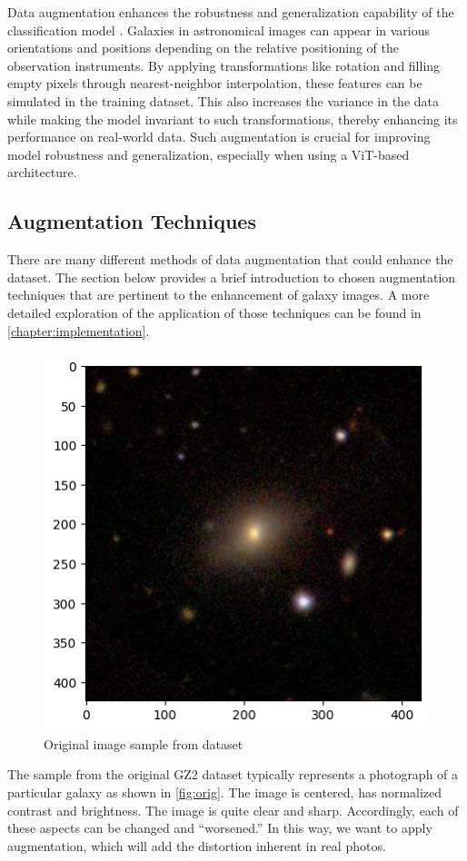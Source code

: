 Data augmentation enhances the robustness and generalization capability of the classification model \cite{ayyadevara2024modern}. Galaxies in astronomical images can appear in various orientations and positions depending on the relative positioning of the observation instruments. By applying transformations like rotation and filling empty pixels through nearest-neighbor interpolation, these features can be simulated in the training dataset. This also increases the variance in the data while making the model invariant to such transformations, thereby enhancing its performance on real-world data. Such augmentation is crucial for improving model robustness and generalization, especially when using a ViT-based architecture.

\subsection*{Augmentation Techniques}
\label{sec:augmentation-tech}

There are many different methods of data augmentation that could enhance the dataset. The section below provides a brief introduction to chosen augmentation techniques that are pertinent to the enhancement of galaxy images. A more detailed exploration of the application of those techniques can be found in \autoref{chapter:implementation}.

\medskip


\begin{figure}[htbp]\centering
  \centering
  \includegraphics[width=0.5\linewidth]{obrazky-figures/03-dataset/orig.png}
  \caption{Original image sample from dataset}
  \label{fig:orig}
\end{figure}

The sample from the original GZ2 dataset typically represents a photograph of a particular galaxy as shown in \autoref{fig:orig}. The image is centered, has normalized contrast and brightness. The image is quite clear and sharp. Accordingly, each of these aspects can be changed and \enquote{worsened.} In this way, we want to apply augmentation, which will add the distortion inherent in real photos.

